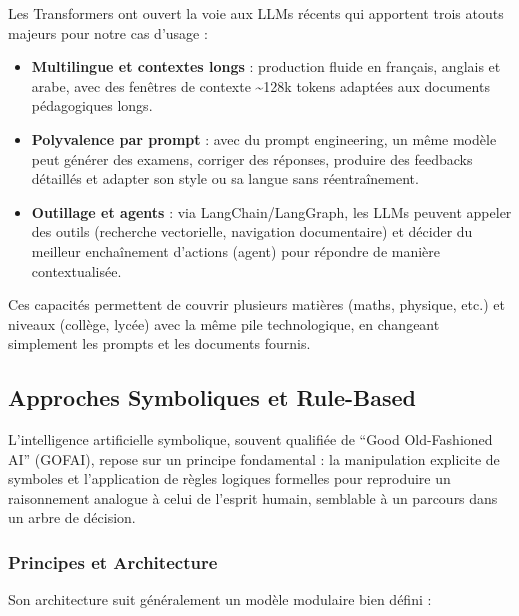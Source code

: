 Les Transformers ont ouvert la voie aux LLMs récents qui apportent trois atouts majeurs pour notre cas d’usage :
\begin{itemize}
    \item \textbf{Multilingue et contextes longs} : production fluide en français, anglais et arabe, avec des fenêtres de contexte \textasciitilde{}128k tokens adaptées aux documents pédagogiques longs.
    \item \textbf{Polyvalence par prompt} : avec du prompt engineering, un même modèle peut générer des examens, corriger des réponses, produire des feedbacks détaillés et adapter son style ou sa langue sans réentraînement.
    \item \textbf{Outillage et agents} : via LangChain/LangGraph, les LLMs peuvent appeler des outils (recherche vectorielle, navigation documentaire) et décider du meilleur enchaînement d’actions (agent) pour répondre de manière contextualisée.
\end{itemize}

Ces capacités permettent de couvrir plusieurs matières (maths, physique, etc.) et niveaux (collège, lycée) avec la même pile technologique, en changeant simplement les prompts et les documents fournis.

\subsection{Approches Symboliques et Rule-Based}

L'intelligence artificielle symbolique, souvent qualifiée de \enquote{Good Old-Fashioned AI} (GOFAI), repose sur un principe fondamental : la manipulation explicite de symboles et l'application de règles logiques formelles pour reproduire un raisonnement analogue à celui de l'esprit humain, semblable à un parcours dans un arbre de décision.

\subsubsection{Principes et Architecture}

Son architecture suit généralement un modèle modulaire bien défini :

